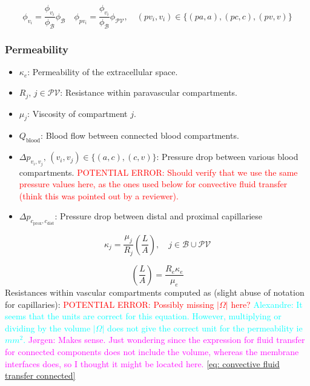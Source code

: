 \documentclass{article}
\theoremstyle{definition}
\theoremstyle{plain}
\theoremstyle{remark}
\newcommand{\ISSUE}[1]{\textcolor{red}{POTENTIAL ERROR: #1}}
\newcommand{\AP}[1]{\textcolor{cyan}{Alexandre: #1}}
\newcommand{\JR}[1]{\textcolor{Fuchsia}{Jørgen: #1}}
\begin{document}
\begin{equation}
    \phi_{v_i} = \frac{\phi_{v_i}}{\phi_{\mathcal{B}}} \phi_{\mathcal{B}} \quad \phi_{pv_i} = \frac{\phi_{v_i}}{\phi_{\mathcal{B}}} \phi_{\mathcal{PV}}, \quad (pv_i, v_i) \in \{(pa, a), (pc, c), (pv, v)\}
    \label{eq: porosities}
\end{equation}

\subsubsection*{Permeability}
\begin{itemize}
    \item $\kappa_e$: Permeability of the extracellular space.
    \item $R_j, \, j \in \mathcal{PV}$:  Resistance within paravascular compartments.
    \item $\mu_j$: Viscosity of compartment $j$.
    \item $ Q_{\text{blood}}$: Blood flow between connected blood compartments.
    \item \( \Delta p_{v_i, v_j}, \, (v_i, v_j) \in \{(a, c), (c, v) \} \): Pressure drop between various blood compartments. \ISSUE{Should verify that we use the same pressure values here, as the ones used below for convective fluid transfer (think this was pointed out by a reviewer).}
    \item \( \Delta p_{c_\text{prox}, c_\text{dist}} \): Pressure drop between distal and proximal capillariese
\end{itemize}

\begin{equation}
    \kappa_j = \frac{\mu_j}{R_j} \left(\frac{L}{A}\right), \quad j\in \mathcal{B} \cup \mathcal{PV}
\label{eq: permeabilities} 
\end{equation}

\begin{equation}
    \left(\frac{L}{A}\right) = \frac{R_e \kappa_e}{\mu_e}
\label{eq: homogenization length/area relation} 
\end{equation}
Resistances within vascular compartments computed as (slight abuse of notation for capillaries):
\ISSUE{ Possibly missing \( \lvert \Omega \rvert \) here?}
\AP{It seems that the units are correct for this equation. However, multiplying or dividing by the volume $|\Omega|$ does not give the correct unit for the permeability ie $mm^2$.}
\JR{Makes sense. Just wondering since the expression for fluid transfer for connected components does not include the volume, whereas the membrane interfaces does, so I thought it might be located here. \eqref{eq: convective fluid transfer connected}}
\end{document}
